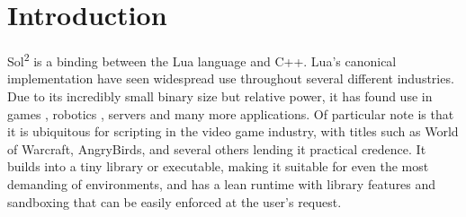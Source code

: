 \documentclass[conference,compsoc]{IEEEtran}
\newcommand{\soltwo}{Sol\textsuperscript{2}}
\begin{document}
\maketitle

\begin{abstract}
Lua is a lightweight scripting language that has grown exponentially in usage, featured in code bases for humanoid robots, video games engines, servers, and many more systems and applications. C and C++ can levy Lua within itself using its C API. However, the API is a low-level and stack-based, making it cumbersome to manage. It also does not handle many language features, library abstractions, and features of languages that are more robust than C, leading many developers to attempt both wrapping and extending the API in various ways, with varying degrees of success and popularity.

I present a novel header-only C++ library \soltwo{} that achieves an easy to use standard library-complimenting API, while still maintaining the equal or near-equal overall performance as compared to using the plain C API. I explore \soltwo{}’s merits and design as a C++ inter-operation library, and compare both its feature set and performance to other existing libraries, highlighting some of the useful features \soltwo{} provides.

\end{abstract}

%
\IEEEpeerreviewmaketitle

\section{Introduction}

\soltwo{}\cite{sol2} is a binding between the Lua language\cite{lua} and C++. Lua's canonical implementation have seen widespread use throughout several different industries. Due to its incredibly small binary size but relative power, it has found use in games \cite{lua-game}, robotics \cite{lua-robot}, servers \cite{lua-light} and many more applications. Of particular note is that it is ubiquitous for scripting in the video game industry, with titles such as World of Warcraft, AngryBirds, and several others\cite{lua-about} lending it practical credence. It builds into a tiny library or executable, making it suitable for even the most demanding of environments, and has a lean runtime with library features and sandboxing that can be easily enforced at the user's request.
\end{document}
